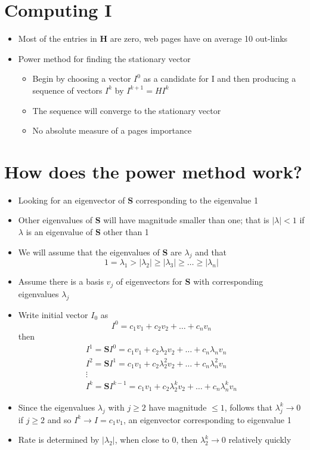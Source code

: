 \documentclass[11pt]{report}
\begin{document}
\section{Computing I}
\begin{itemize}
\item Most of the entries in \textbf{H} are zero, web pages have on average 10 out-links
\item Power method for finding the stationary vector
\begin{itemize}
\item Begin by choosing a vector $I^0$ as a candidate for I and then producing a sequence of vectors $I^k$ by $I^{k+1} = HI^k$
\item The sequence will converge to the stationary vector
\item No absolute measure of a pages importance
\end{itemize}
\end{itemize}
\section{How does the power method work?}
\begin{itemize}
\item Looking for an eigenvector of \textbf{S} corresponding to the eigenvalue 1
\item Other eigenvalues of \textbf{S} will have magnitude smaller than one; that is $\vert\lambda\vert <1$ if $\lambda$ is an eigenvalue of \textbf{S} other than 1
\item We will assume that the eigenvalues of \textbf{S} are $\lambda_j$ and that \begin{equation}
1=\lambda_1>\vert\lambda_2\vert\geq\vert\lambda_3\vert\geq\ldots\geq\vert\lambda_n\vert
\end{equation}
\item Assume there is a basis $v_j$ of eigenvectors for \textbf{S} with corresponding eigenvalues $\lambda_j$ 
\item Write initial vector $I_0$ as \begin{equation}
I^0 = c_1v_1 + c_2v_2 + \ldots + c_nv_n
\end{equation}
then \begin{multline}
I^1 =\textbf{S}I^0= c_1v_1 + c_2\lambda_2v_2 + \ldots + c_n\lambda_nv_n\\
I^2 =\textbf{S}I^1= c_1v_1 + c_2\lambda_2^2v_2 + \ldots + c_n\lambda_n^2v_n\\
\vdots\\
I^k =\textbf{S}I^{k-1}= c_1v_1 + c_2\lambda_2^kv_2 + \ldots + c_n\lambda_n^kv_n
\end{multline}
\item Since the eigenvalues $\lambda_j$ with $j\geq2$ have magnitude $\leq1$, follows that $\lambda^k_j\rightarrow0$ if $j\geq2$ and so $I^k\rightarrow I=c_1v_1$, an eigenvector corresponding to eigenvalue 1
\item Rate is determined by $\vert\lambda_2\vert$, when close to 0, then $\lambda_2^k \rightarrow0$ relatively quickly
\end{itemize}
\end{document}
